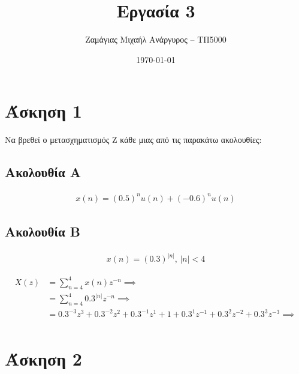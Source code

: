 \documentclass[12pt]{turabian-researchpaper}
\title{Εργασία 3}
\author{Ζαμάγιας Μιχαήλ Ανάργυρος -- ΤΠ5000}
\date{\today}
\begin{document}
\begin{titlepage}
    \maketitle
\end{titlepage}

\tableofcontents

\newpage\section{Άσκηση 1}
Να βρεθεί ο μετασχηματισμός Ζ κάθε μιας από τις παρακάτω ακολουθίες:
\subsection{Ακολουθία A}
\begin{equation*}
    \begin{aligned}
        x(n) = (0.5)^n u(n) + (-0.6)^n u(n)
    \end{aligned}
\end{equation*}

\subsection{Ακολουθία B}
\begin{equation*}
    \begin{aligned}
        x(n) = (0.3)^{| n |} \text{, } | n | < 4
    \end{aligned}
\end{equation*}

\begin{equation*}
    \begin{aligned}
        X(z) & = \sum_{n = 4}^{ 4 } x(n)z^{-n} \implies                                                                           \\
             & = \sum_{n = 4}^{ 4 } 0.3^{|n|} z^{-n} \implies                                                                     \\
             & = 0.3^{-3} z^{3} + 0.3^{-2} z^{2} + 0.3^{-1} z^{1} + 1 + 0.3^{1} z^{-1} + 0.3^{2} z^{-2} + 0.3^{3} z^{-3} \implies \\
    \end{aligned}
\end{equation*}


\newpage\section{Άσκηση 2}
\end{document}
